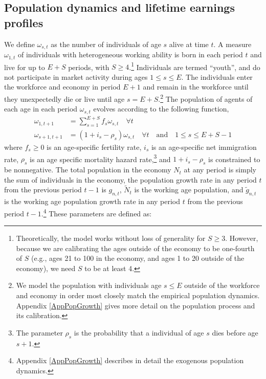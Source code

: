 \documentclass[letterpaper,12pt]{article}
\theoremstyle{definition}
\begin{document}
\begin{spacing}{1.5}


  \subsection{Population dynamics and lifetime earnings profiles}\label{SecPopDyn}

    We define $\omega_{s,t}$ as the number of individuals of age $s$ alive at time $t$. A measure $\omega_{1,t}$ of individuals with heterogeneous working ability is born in each period $t$ and live for up to $E+S$ periods, with $S\geq 4$.\footnote{Theoretically, the model works without loss of generality for $S\geq 3$. However, because we are calibrating the ages outside of the economy to be one-fourth of $S$ (e.g., ages 21 to 100 in the economy, and ages 1 to 20 outside of the economy), we need $S$ to be at least 4.} Individuals are termed ``youth'', and do not participate in market activity during ages $1\leq s\leq E$. The individuals enter the workforce and economy in period $E+1$ and remain in the workforce until they unexpectedly die or live until age $s=E+S$.\footnote{We model the population with individuals age $s\leq E$ outside of the workforce and economy in order most closely match the empirical population dynamics. Appendix \ref{AppPopGrowth} gives more detail on the population process and its calibration.} The population of agents of each age in each period $\omega_{s,t}$ evolves according to the following function,
    \begin{equation}\label{EqPopLawofmotion}
      \begin{split}
        \omega_{1,t+1} &= \sum_{s=1}^{E+S} f_s\omega_{s,t}\quad\forall t \\
        \omega_{s+1,t+1} &= (1 + i_s - \rho_s)\omega_{s,t}\quad\forall t\quad\text{and}\quad 1\leq s \leq E+S-1
      \end{split}
    \end{equation}
    where $f_s\geq 0$ is an age-specific fertility rate, $i_s$ is an age-specific net immigration rate, $\rho_s$ is an age specific mortality hazard rate,\footnote{The parameter $\rho_s$ is the probability that a individual of age $s$ dies before age $s+1$.} and $1+i_s-\rho_s$ is constrained to be nonnegative. The total population in the economy $N_t$ at any period is simply the sum of individuals in the economy, the population growth rate in any period $t$ from the previous period $t-1$ is $g_{n,t}$, $\tilde{N}_t$ is the working age population, and $\tilde{g}_{n,t}$ is the working age population growth rate in any period $t$ from the previous period $t-1$.\footnote{Appendix \ref{AppPopGrowth} describes in detail the exogenous population dynamics.} These parameters are defined as:

\end{spacing}
\end{document}
